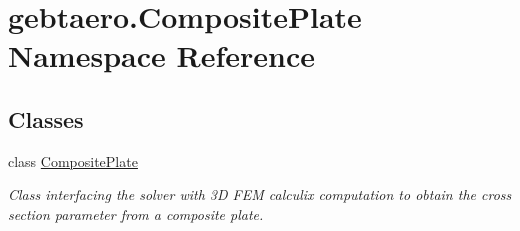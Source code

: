 \hypertarget{namespacegebtaero_1_1_composite_plate}{}\section{gebtaero.\+Composite\+Plate Namespace Reference}
\label{namespacegebtaero_1_1_composite_plate}
\subsection*{Classes}
\begin{DoxyCompactItemize}
\item 
class \hyperlink{classgebtaero_1_1_composite_plate_1_1_composite_plate}{Composite\+Plate}
\begin{DoxyCompactList}\small\item\em Class interfacing the solver with 3D F\+EM calculix computation to obtain the cross section parameter from a composite plate. \end{DoxyCompactList}\end{DoxyCompactItemize}
